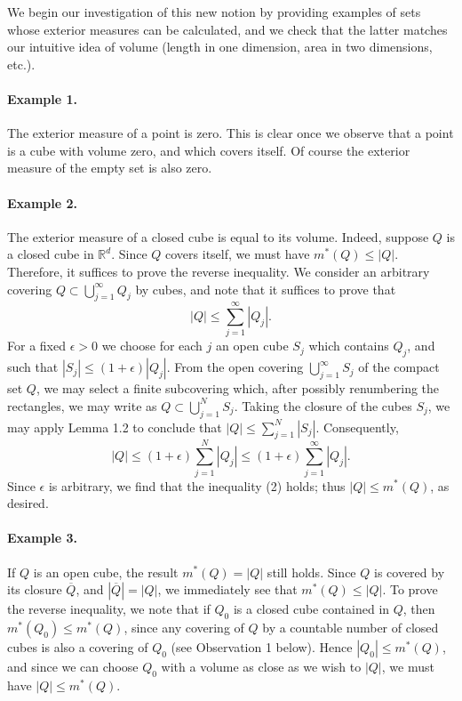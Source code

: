 \documentclass[11pt,openany]{book}
\begin{document}
We begin our investigation of this new notion by providing examples of sets whose exterior measures can be calculated, and we check that the latter matches our intuitive idea of volume (length in one dimension, area in two dimensions, etc.).

\paragraph{Example 1.} The exterior measure of a point is zero. This is clear once we observe that a point is a cube with volume zero, and which covers itself. Of course the exterior measure of the empty set is also zero.

\paragraph{Example 2.} The exterior measure of a closed cube is equal to its volume. Indeed, suppose $Q$ is a closed cube in $\mathbb{R}^d$. Since $Q$ covers itself, we must have $m^*(Q)\le |Q|$. Therefore, it suffices to prove the reverse inequality. We consider an arbitrary covering $Q\subset\bigcup_{j=1}^{\infty}Q_j$ by cubes, and note that it suffices to prove that
\begin{equation}
 |Q|\le\sum_{j=1}^{\infty}|Q_j|.
 \tag{2}
\end{equation}
For a fixed $\epsilon>0$ we choose for each $j$ an open cube $S_j$ which contains $Q_j$, and such that $|S_j|\le(1+\epsilon)|Q_j|$. From the open covering $\bigcup_{j=1}^{\infty}S_j$ of the compact set $Q$, we may select a finite subcovering which, after possibly renumbering the rectangles, we may write as $Q\subset\bigcup_{j=1}^N S_j$. Taking the closure of the cubes $S_j$, we may apply Lemma 1.2 to conclude that $|Q|\le\sum_{j=1}^N|S_j|$. Consequently,
\[
 |Q|\le(1+\epsilon)\sum_{j=1}^N|Q_j|
 \le(1+\epsilon)\sum_{j=1}^{\infty}|Q_j|.
\]
Since $\epsilon$ is arbitrary, we find that the inequality (2) holds; thus $|Q|\le m^*(Q)$, as desired.

\paragraph{Example 3.} If $Q$ is an open cube, the result $m^*(Q)=|Q|$ still holds. Since $Q$ is covered by its closure $\overline Q$, and $|\overline Q|=|Q|$, we immediately see that $m^*(Q)\le |Q|$. To prove the reverse inequality, we note that if $Q_0$ is a closed cube contained in $Q$, then $m^*(Q_0)\le m^*(Q)$, since any covering of $Q$ by a countable number of closed cubes is also a covering of $Q_0$ (see Observation 1 below). Hence $|Q_0|\le m^*(Q)$, and since we can choose $Q_0$ with a volume as close as we wish to $|Q|$, we must have $|Q|\le m^*(Q)$.
\end{document}
